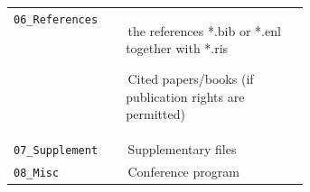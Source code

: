 {\begin{minipage}{\dimexpr\linewidth-2\fboxrule-2\fboxsep\relax}
\begin{tabularx}{\linewidth}{
				>{\raggedright\arraybackslash}p{0.38\linewidth}
				>{\raggedright\arraybackslash}X
			}
			\texttt{06\_References} &
			\,\tabitem the references *.bib or *.enl together with *.ris
			\par\smallskip
			\,\tabitem Cited papers/books (if publication rights are permitted) \\
			
			\texttt{07\_Supplement} &
			\,\tabitem Supplementary files \\
			
			\texttt{08\_Misc} &
			\,\tabitem Conference program \\
			
		\end{tabularx}
		
	\end{minipage}%
}

\endgroup
